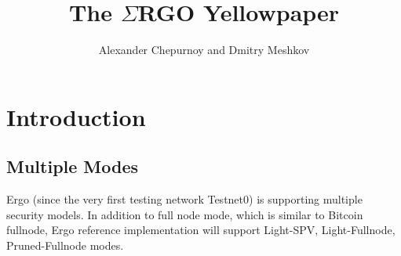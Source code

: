 \documentclass[]{report}   %
\newcommand{\ergo}{$\Sigma$RGO}
\begin{document}
\title{The \ergo{} Yellowpaper}
\author{Alexander Chepurnoy and Dmitry Meshkov}
\maketitle

\section{Introduction}
\subsection{Multiple Modes}
Ergo (since the very first testing network Testnet0) is supporting multiple security models. In addition to full node mode, which is similar to Bitcoin fullnode, Ergo reference implementation will support Light-SPV, Light-Fullnode, Pruned-Fullnode modes.
\end{document}
